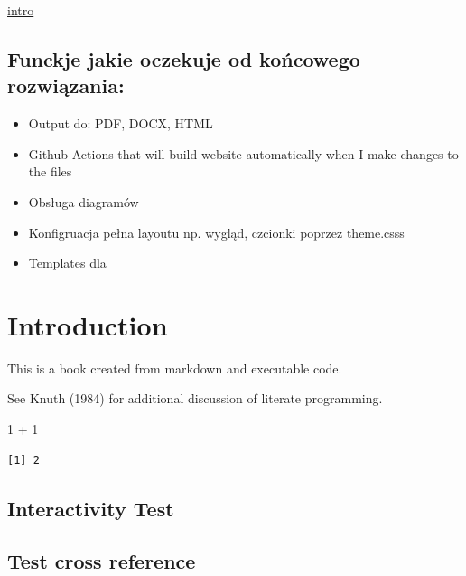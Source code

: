 \documentclass[
  a4paper,
  DIV=11,
  numbers=noendperiod,
  oneside,
  open=any]{scrreprt}
\newenvironment{Shaded}{\begin{snugshade}}{\end{snugshade}}
\newcommand{\DecValTok}[1]{\textcolor[rgb]{0.68,0.00,0.00}{#1}}
\newcommand{\SpecialCharTok}[1]{\textcolor[rgb]{0.37,0.37,0.37}{#1}}
\begin{document}
\hyperref[podziaux5cux25C5ux5cux2582-na-dwie-kolumny]{intro}

\section*{Funckje jakie oczekuje od końcowego
rozwiązania:}\label{funckje-jakie-oczekuje-od-koux144cowego-rozwiux105zania}


\begin{itemize}
\item
  Output do: PDF, DOCX, HTML
\item
  Github Actions that will build website automatically when I make
  changes to the files
\item
  Obsługa diagramów
\item
  Konfigruacja pełna layoutu np. wygląd, czcionki poprzez theme.csss
\item
  Templates dla
\end{itemize}


\chapter{Introduction}\label{introduction}

This is a book created from markdown and executable code.

See Knuth (1984) for additional discussion of literate programming.

\begin{Shaded}
\begin{Highlighting}[]
\DecValTok{1} \SpecialCharTok{+} \DecValTok{1}
\end{Highlighting}
\end{Shaded}

\begin{verbatim}
[1] 2
\end{verbatim}

\section{Interactivity Test}\label{interactivity-test}

\section{Test cross reference}\label{test-cross-reference}
\end{document}
